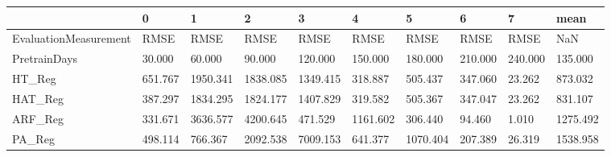 \begin{tabular}{llllllllll}
\toprule
{} &       0 &        1 &        2 &        3 &        4 &        5 &       6 &       7 &     mean \\
\midrule
EvaluationMeasurement &    RMSE &     RMSE &     RMSE &     RMSE &     RMSE &     RMSE &    RMSE &    RMSE &      NaN \\
PretrainDays          &  30.000 &   60.000 &   90.000 &  120.000 &  150.000 &  180.000 & 210.000 & 240.000 &  135.000 \\
HT\_Reg                & 651.767 & 1950.341 & 1838.085 & 1349.415 &  318.887 &  505.437 & 347.060 &  23.262 &  873.032 \\
HAT\_Reg               & 387.297 & 1834.295 & 1824.177 & 1407.829 &  319.582 &  505.367 & 347.047 &  23.262 &  831.107 \\
ARF\_Reg               & 331.671 & 3636.577 & 4200.645 &  471.529 & 1161.602 &  306.440 &  94.460 &   1.010 & 1275.492 \\
PA\_Reg                & 498.114 &  766.367 & 2092.538 & 7009.153 &  641.377 & 1070.404 & 207.389 &  26.319 & 1538.958 \\
\bottomrule
\end{tabular}
